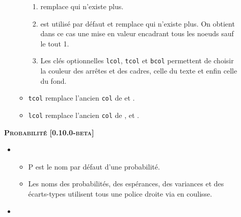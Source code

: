 \documentclass[12pt,a4paper]{book}
\begin{document}
\begin{description}
\begin{itemize}[itemsep=.5em]
\begin{itemize}[itemsep=.5em]
\begin{enumerate}
            	\item {} remplace  qui n'existe plus.
    
            	\item {} est utilisé par défaut et remplace  qui n'existe plus. On obtient dans ce cas une mise en valeur encadrant tous les noeuds sauf le tout 1\ier{}.
    
            	\item Les clés optionnelles \verb#lcol#, \verb#tcol# et \verb#bcol# permettent de choisir la couleur des arrêtes et des cadres, celle du texte et enfin celle du fond.
            \end{enumerate}
    
    
            \item \verb#tcol# remplace l'ancien \verb#col# de  et .
    
    		\item \verb#lcol# remplace l'ancien \verb#col# de ,  et .
    
    
    
        \end{itemize}
    \end{itemize}
    
    
    \begin{center}
        \textbf{\textsc{Probabilité [0.10.0-beta]}}
    \end{center}
    
    \begin{itemize}[itemsep=.5em]
        \item {}
    
        \begin{itemize}[itemsep=.5em]
            \item $\mathrm{P}$ est le nom par défaut d'une probabilité.
    
    		\item Les noms des probabilités, des espérances, des variances et des écarts-types utilisent tous une police droite via  en coulisse.
        \end{itemize}
    
    
    
    
        \item {}
    

\end{itemize}
\end{description}
\end{document}
